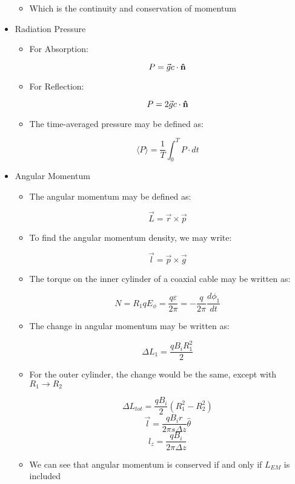 \begin{itemize}
\begin{itemize}
      \item Which is the continuity and conservation of momentum

    \end{itemize}

  \item Radiation Pressure

    \begin{itemize}

      \item For Absorption:

        $$P=\vec{g}c\cdot\bold{\hat{n}}$$

      \item For Reflection:

        $$P=2\vec{g}c\cdot\bold{\hat{n}}$$

      \item The time-averaged pressure may be defined as:

        $$\langle P\rangle=\frac{1}{T}\int_0^TP\cdot dt$$

    \end{itemize}

  \item Angular Momentum

    \begin{itemize}

      \item The angular momentum may be defined as:

        $$\vec{L}=\vec{r}\times\vec{p}$$

      \item To find the angular momentum density, we may write:

        $$\vec{l}=\vec{p}\times\vec{g}$$

      \item The torque on the inner cylinder of a coaxial cable may be written as:

        $$N=R_1qE_{\phi}=\frac{q\varepsilon}{2\pi}=-\frac{q}{2\pi}\frac{d\phi_1}{dt}$$

      \item The change in angular momentum may be written as:

        $$\Delta L_1=\frac{qB_iR_1^2}{2}$$

      \item For the outer cylinder, the change would be the same, except with $R_1\to R_2$

        $$\Delta L_{tot}=\frac{qB_i}{2}(R_1^2-R_2^2)$$
        $$\vec{l}=\frac{qB_i r}{2\pi s\Delta z}\hat{\theta}$$
        $$l_z=\frac{qB_i}{2\pi\Delta z}$$

      \item We can see that angular momentum is conserved if and only if $L_{EM}$ is included

    \end{itemize}

\end{itemize}



